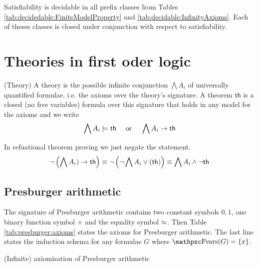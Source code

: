 \begin{lemma}
	Satisfiability is decidable \cite{MR1482227} in all prefix classes from Tables 
	\ref{tab:decidedable:FiniteModelProperty} and \ref{tab:decidable:InfinityAxioms}.
	Each of theses classes is closed under conjunction with respect to satisfiability.
\end{lemma}



\section{Theories in first oder logic}\label{sec:decidable:fol:theories}

\begin{definition}(Theory)
	A theory is the possible infinite conjunction $\bigwedge A_i$ of universally quantified formulae, i.e. the axioms over the theory's signature. A theorem $\mathsf{th}$ is a closed (no free variables) formula over this signature
	that holds in any model for the axioms and we write
	\[
		\bigwedge A_i \models \mathsf{th} 
		\quad\text{ or }\quad
		\bigwedge A_i \rightarrow \mathsf{th} 
	\]
\end{definition}

In refuational theorem proving we just negate the statement.
\[
	\lnot\left(\bigwedge A_i) \rightarrow \mathsf{th}\right) \equiv
	\lnot\left(\lnot\bigwedge A_i \lor \mathsf{(th)}\right) \equiv
	\bigwedge A_i \land \lnot \mathsf{th}
\]





\subsection{Presburger arithmetic}

The signature of Presburger arithmetic contains two constant symbols $0,1$, 
one binary function symbol $+$ and the equality symbol $\approx$.
Then Table \ref{tab:presburger:axioms} states the axioms for Presburger arithmetic. 
The last line states the induction schema for any formulae $G$ where $\fvar(G) = \{ x \}$.

\begin{table}[hbt]
	
	\caption{(Infinite) axiomisation of Presburger arithmetic}
	\label{tab:presburger:axioms}
\end{table}

